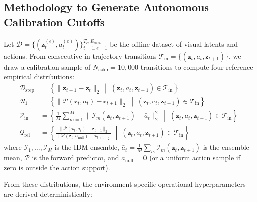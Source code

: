 \documentclass[11pt]{article}
\newcommand{\zv}{\mathbf{z}}
\begin{document}
\subsection{Methodology to Generate Autonomous Calibration Cutoffs}
\label{sec:cutoff-generation}

Let $\mathcal{D} = \{(\zv_t^{(e)}, a_t^{(e)})\}_{t=1, e=1}^{T_e, E_{\text{data}}}$ be the offline dataset of visual latents and actions.
From consecutive in-trajectory transitions $\mathcal{T}_{\text{in}} = \{(\zv_t, a_t, \zv_{t+1})\}$, we draw a calibration sample of
$N_{\text{calib}} = 10{,}000$ transitions to compute four reference empirical distributions:
\begin{align}
\mathcal{D}_{\text{step}} &= \left\{ \|\zv_{t+1} - \zv_t\|_2 \;\middle|\; (\zv_t, a_t, \zv_{t+1}) \in \mathcal{T}_{\text{in}} \right\} \\
\mathcal{R}_1 &= \left\{ \|\mathcal{P}(\zv_t, a_t) - \zv_{t+1}\|_2 \;\middle|\; (\zv_t, a_t, \zv_{t+1}) \in \mathcal{T}_{\text{in}} \right\} \\
\mathcal{V}_{\text{in}} &= \left\{ \frac{1}{M}\sum_{m=1}^M \|\mathcal{I}_m(\zv_t, \zv_{t+1}) - \bar{a}_t\|_2^2 \;\middle|\; (\zv_t, a_t, \zv_{t+1}) \in \mathcal{T}_{\text{in}} \right\} \\
\mathcal{Q}_{\text{rel}} &= \left\{ \frac{\|\mathcal{P}(\zv_t, a_t) - \zv_{t+1}\|_2}{\|\mathcal{P}(\zv_t, a_{\mathrm{null}}) - \zv_{t+1}\|_2} \;\middle|\; (\zv_t, a_t, \zv_{t+1}) \in \mathcal{T}_{\text{in}} \right\}
\end{align}
where $\mathcal{I}_1, \dots, \mathcal{I}_M$ is the IDM ensemble, $\bar{a}_t = \frac{1}{M}\sum_m \mathcal{I}_m(\zv_t, \zv_{t+1})$
is the ensemble mean, $\mathcal{P}$ is the forward predictor, and $a_{\mathrm{null}} = \mathbf{0}$ (or a uniform action sample if zero
is outside the action support).

From these distributions, the environment-specific operational hyperparameters are derived deterministically:
\end{document}
